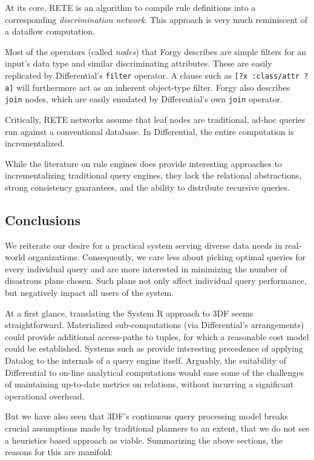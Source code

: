 \documentclass[../index.tex]{subfiles}
\begin{document}
At its core, RETE is an algorithm to compile rule definitions into a
corresponding \emph{discrimination network}. This approach is very
much reminiscent of a dataflow computation.

Most of the operators (called \emph{nodes}) that Forgy describes are
simple filters for an input's data type and similar discriminating
attributes. These are easily replicated by Differential's
\texttt{filter} operator. A clause such as \texttt{[?x :class/attr
    ?a]} will furthermore act as an inherent object-type filter.
Forgy also describes \texttt{join} nodes, which are easily emulated by
Differential's own \texttt{join} operator.

Critically, RETE networks assume that leaf nodes are traditional,
ad-hoc queries run against a conventional database. In Differential,
the entire computation is incrementalized.

While the literature on rule engines does provide interesting
approaches to incrementalizing traditional query engines, they lack
the relational abstractions, strong consistency guarantees, and the
ability to distribute recursive queries.

\subsection{Conclusions}

We reiterate our desire for a practical system serving diverse data
needs in real-world organizations. Consequently, we care less about
picking optimal queries for every individual query and are more
interested in minimizing the number of disastrous plans chosen. Such
plans not only affect individual query performance, but negatively
impact all users of the system.

At a first glance, translating the System R approach to 3DF seems
straightforward. Materialized sub-computations (via Differential's
arrangements) could provide additional access-paths to tuples, for
which a reasonable cost model could be established. Systems such as
\cite{condie2008evita} provide interesting precedence of applying
Datalog to the internals of a query engine itself. Arguably, the
suitability of Differential to on-line analytical computations would
ease some of the challenges of maintaining up-to-date metrics on
relations, without incurring a significant operational overhead.

But we have also seen that 3DF's continuous query processing model
breaks crucial assumptions made by traditional planners to an extent,
that we do not see a heuristics based approach as viable. Summarizing
the above sections, the reasons for this are manifold:
\end{document}
